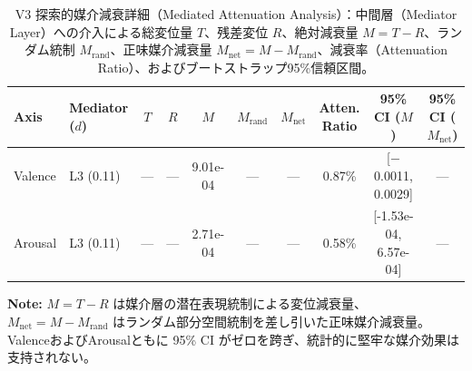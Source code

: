 \begin{table}[htbp]
\centering
\small
\caption{V3 探索的媒介減衰詳細（Mediated Attenuation Analysis）：中間層（Mediator Layer）への介入による総変位量 $T$、残差変位 $R$、絶対減衰量 $M = T - R$、ランダム統制 $M_{\text{rand}}$、正味媒介減衰量 $M_{\text{net}} = M - M_{\text{rand}}$、減衰率（Attenuation Ratio）、およびブートストラップ95\%信頼区間。}
\label{tab:v3_mediated_attenuation}
\begin{tabular}{ll cccccc cc}
\toprule
\textbf{Axis} & \textbf{Mediator ($d$)} & $T$ & $R$ & $M$ & $M_{\text{rand}}$ & $M_{\text{net}}$ & \textbf{Atten. Ratio} & \textbf{95\% CI ($M$)} & \textbf{95\% CI ($M_{\text{net}}$)} \\
\midrule
Valence    & L3 (0.11)        & ---      & ---      & 9.01e-04   & ---        & ---        & 0.87\%         & [$-$0.0011, 0.0029]    & --- \\
Arousal    & L3 (0.11)        & ---      & ---      & 2.71e-04   & ---        & ---        & 0.58\%         & [-1.53e-04, 6.57e-04]  & --- \\
\bottomrule
\end{tabular}
\vspace{1ex}
\begin{minipage}{\linewidth}
\footnotesize
\textbf{Note:} $M = T - R$ は媒介層の潜在表現統制による変位減衰量、$M_{\text{net}} = M - M_{\text{rand}}$ はランダム部分空間統制を差し引いた正味媒介減衰量。ValenceおよびArousalともに 95\% CI がゼロを跨ぎ、統計的に堅牢な媒介効果は支持されない。
\end{minipage}
\end{table}